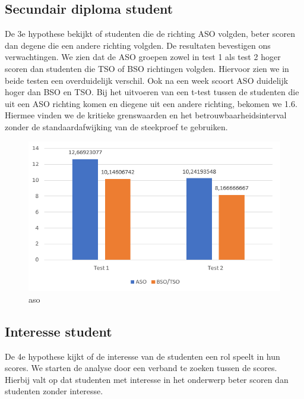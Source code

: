 \documentclass{hogent-article}
\begin{document}
	\subsection{Secundair diploma student}
	De 3e hypothese bekijkt of studenten die de richting ASO volgden, beter scoren dan degene die een andere richting volgden. De resultaten bevestigen ons verwachtingen. We zien dat de ASO groepen zowel in test 1 als test 2 hoger scoren dan studenten die TSO of BSO richtingen volgden. Hiervoor zien we in beide testen een overduidelijk verschil. Ook na een week scoort ASO duidelijk hoger dan BSO en TSO. Bij het uitvoeren van een t-test tussen de studenten die uit een ASO richting komen en diegene uit een andere richting, bekomen we 1.6. Hiermee vinden we de kritieke grenswaarden en het betrouwbaarheidsinterval zonder de standaardafwijking van de steekproef te gebruiken.
    
	\begin{figure}[H]
        \includegraphics[width=\linewidth]{img/aso.png}
        \caption{aso}
    \end{figure}
	
	
	\subsection{Interesse student}
	De 4e hypothese kijkt of de interesse van de studenten een rol speelt in hun scores. We starten de analyse door een verband te zoeken tussen de scores. Hierbij valt op dat studenten met interesse in het onderwerp beter scoren dan studenten zonder interesse. 
    
	
	
\end{document}
